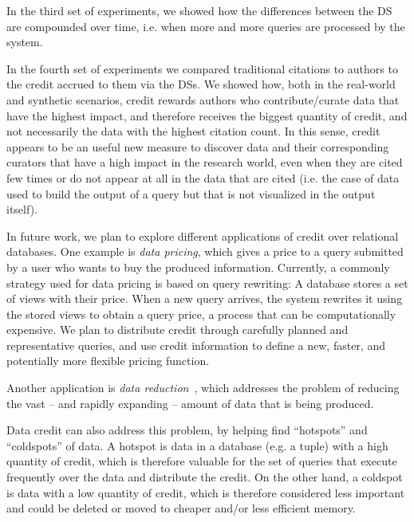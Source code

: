 In the third set of experiments, we showed how the differences between the DS are compounded over time, i.e. when more and more queries are processed by the system.

In the fourth set of experiments we compared traditional citations to authors to the credit accrued to them via the DSs. We showed how, both in the real-world and synthetic scenarios, credit rewards authors 
who contribute/curate data that have the highest impact, and therefore receives the biggest quantity of credit, and not necessarily the data with the highest citation count. 
In this sense, credit appears to be an useful new measure to discover data and their corresponding curators that have a high impact in the research world, even when they are cited few times or do not appear at all in the data that are cited (i.e. the case of data used to build the output of a query but that is not visualized in the output itself).

In future work, we plan to explore different applications of credit over relational databases.
One example is \emph{data pricing}, which gives a price to a query submitted by a user who wants to buy the produced information. Currently, a commonly strategy used for data pricing is based on query rewriting:  A database stores a set of views with their price. When a new query arrives, the system rewrites it using the stored views to obtain a query price, a process that can be computationally expensive.
We plan to distribute credit through carefully planned and representative queries, and use credit information to define a new, faster, and potentially more flexible pricing function.

Another application is \emph{data reduction}~\cite{milo2019getting}, which addresses the problem of reducing the vast -- and rapidly expanding -- amount of data that is being produced. %

Data credit can also address this problem, by helping find ``hotspots'' and ``coldspots'' of data. A hotspot is data in a database (e.g. a tuple) with a high quantity of credit, which is therefore valuable for the set of queries that execute frequently over the data and distribute the credit. 
On the other hand, a coldspot is data with a low quantity of credit, which is therefore  considered less  important and could be deleted or moved to cheaper and/or less efficient memory. 
